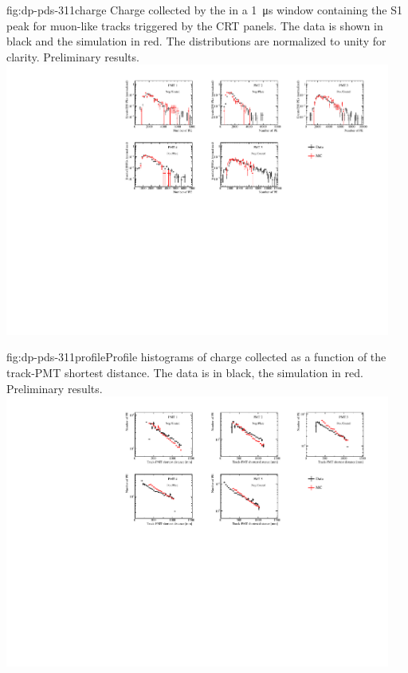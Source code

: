 \begin{dunefigure}{fig:dp-pds-311charge}{ Charge collected by the  in a \SI{1}{\us} window containing the S1 peak for muon-like tracks triggered by the CRT panels. The data is shown in black and the simulation in red. The distributions are normalized to unity for clarity. Preliminary results.}
\includegraphics[width=0.95\textwidth]{graphics/dppd_311_charge_mc_v2.pdf}
\end{dunefigure}

\begin{dunefigure}{fig:dp-pds-311profile}{Profile histograms of charge collected as a function of the track-PMT shortest distance. The data is in black, the simulation in red. Preliminary results.}
\includegraphics[width=0.95\textwidth]{graphics/dppd_311_charge_dist_mc.pdf}
\end{dunefigure}

